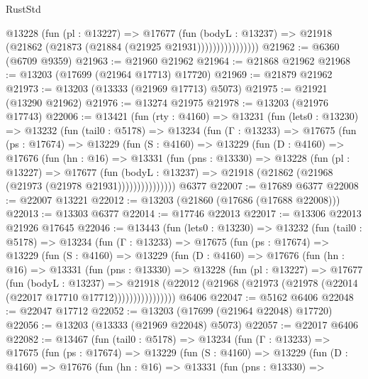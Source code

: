\begin{lexlean}{RustStd}
\begin{coremodule}
                      @13228
                        (fun (pl : @13227) =>
                        @17677
                          (fun (bodyL : @13237) =>
                          @21918 (@21862 (@21873 (@21884 (@21925 @21931))))))))))))))))
@21962 := @6360 (@6709 @9359)
@21963 := @21960 @21962
@21964 := @21868 @21962
@21968 := @13203 (@17699 (@21964 @17713) @17720)
@21969 := @21879 @21962
@21973 := @13203 (@13333 (@21969 @17713) @5073)
@21975 := @21921 (@13290 @21962)
@21976 := @13274 @21975
@21978 := @13203 (@21976 @17743)
@22006 := @13421
    (fun (rty : @4160) =>
    @13231
      (fun (lets0 : @13230) =>
      @13232
        (fun (tail0 : @5178) =>
        @13234
          (fun (Γ : @13233) =>
          @17675
            (fun (ps : @17674) =>
            @13229
              (fun (S : @4160) =>
              @13229
                (fun (D : @4160) =>
                @17676
                  (fun (hn : @16) =>
                  @13331
                    (fun (pns : @13330) =>
                    @13228
                      (fun (pl : @13227) =>
                      @17677
                        (fun (bodyL : @13237) =>
                        @21918 (@21862 (@21968 (@21973 (@21978 @21931)))))))))))))))
    @6377
@22007 := @17689 @6377
@22008 := @22007 @13221
@22012 := @13203 (@21860 (@17686 (@17688 @22008)))
@22013 := @13303 @6377
@22014 := @17746 @22013
@22017 := @13306 @22013 @21926 @17645
@22046 := @13443
    (fun (lets0 : @13230) =>
    @13232
      (fun (tail0 : @5178) =>
      @13234
        (fun (Γ : @13233) =>
        @17675
          (fun (ps : @17674) =>
          @13229
            (fun (S : @4160) =>
            @13229
              (fun (D : @4160) =>
              @17676
                (fun (hn : @16) =>
                @13331
                  (fun (pns : @13330) =>
                  @13228
                    (fun (pl : @13227) =>
                    @17677
                      (fun (bodyL : @13237) =>
                      @21918
                        (@22012
                          (@21968 (@21973 (@21978 (@22014 (@22017 @17710 @17712))))))))))))))))
    @6406
@22047 := @5162 @6406
@22048 := @22047 @17712
@22052 := @13203 (@17699 (@21964 @22048) @17720)
@22056 := @13203 (@13333 (@21969 @22048) @5073)
@22057 := @22017 @6406
@22082 := @13467
    (fun (tail0 : @5178) =>
    @13234
      (fun (Γ : @13233) =>
      @17675
        (fun (ps : @17674) =>
        @13229
          (fun (S : @4160) =>
          @13229
            (fun (D : @4160) =>
            @17676
              (fun (hn : @16) =>
              @13331
                (fun (pns : @13330) =>

\end{coremodule}
\end{lexlean}
